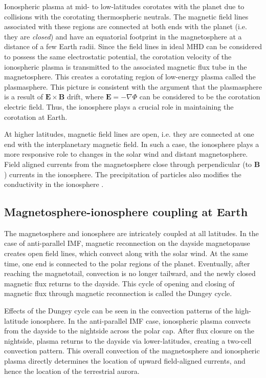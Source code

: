 Ionospheric plasma at mid- to low-latitudes corotates with the planet due to collisions with the corotating thermospheric neutrals. The magnetic field lines associated with these regions are connected at both ends with the planet (i.e. they are \emph{closed}) and have an equatorial footprint in the magnetosphere at a distance of a few Earth radii. Since the field lines in ideal MHD can be considered to possess the same electrostatic potential, the corotation velocity of the ionospheric plasma is transmitted to the associated magnetic flux tube in the magnetosphere. This creates a corotating region of low-energy plasma called the plasmasphere. This picture is consistent with the argument that the plasmasphere is a result of $\mathbf{E}\times\mathbf{B}$ drift, where $\mathbf{E}=-\nabla \Phi$ can be considered to be the corotation electric field. Thus, the ionosphere plays a crucial role in maintaining the corotation at Earth. 

At higher latitudes, magnetic field lines are open, i.e. they are connected at one end with the interplanetary magnetic field. In such a case, the ionosphere plays a more responsive role to changes in the solar wind and distant magnetosphere. Field aligned currents from the magnetosphere close through perpendicular (to $\mathbf{B}$) currents in the ionosphere. The precipitation of particles also modifies the conductivity in the ionosphere \cite{Schunk2009Ionospheres}. 

\subsection{Magnetosphere-ionosphere coupling at Earth}
The magnetosphere and ionosphere are intricately coupled at all latitudes. In the case of anti-parallel IMF, magnetic reconnection on the dayside magnetopause creates open field lines, which convect along with the solar wind. At the same time, one end is connected to the polar regions of the planet. Eventually, after reaching the magnetotail, convection is no longer tailward, and the newly closed magnetic flux returns to the dayside. This cycle of opening and closing of magnetic flux through magnetic reconnection is called the Dungey cycle. 

Effects of the Dungey cycle can be seen in the convection patterns of the high-latitude ionosphere. In the anti-parallel IMF case, ionospheric plasma convects from the dayside to the nightside across the polar cap. After flux closure on the nightside, plasma returns to the dayside via lower-latitudes, creating a two-cell convection pattern. This overall convection of the magnetosphere and ionospheric plasma directly determines the location of upward field-aligned currents, and hence the location of the terrestrial aurora. 

